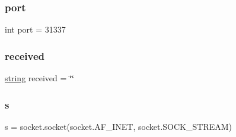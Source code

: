 \mbox{\label{namespacetester_a63c89c04d1feae07ca35558055155ffb}} 
\subsubsection{\texorpdfstring{port}{port}}
{\footnotesize\ttfamily int port = 31337}

\mbox{\label{namespacetester_afe46e2ba1d74c064ee6ff5021a505d2f}} 
\subsubsection{\texorpdfstring{received}{received}}
{\footnotesize\ttfamily \hyperlink{string_8h_a3d2981d9da3e25dd89371059777fdd12}{string} received = \char`\"{}\char`\"{}}

\mbox{\label{namespacetester_a3691308f2a4c2f6983f2880d32e29c84}} 
\subsubsection{\texorpdfstring{s}{s}}
{\footnotesize\ttfamily s = socket.\+socket(socket.\+A\+F\+\_\+\+I\+N\+ET, socket.\+S\+O\+C\+K\+\_\+\+S\+T\+R\+E\+AM)}

